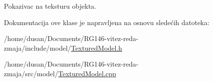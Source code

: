 Pokazivac na teksturu objekta. 



Dokumentacija ove klase je napravljena na osnovu sledećih datoteka\+:\begin{DoxyCompactItemize}
\item 
/home/dusan/\+Documents/\+R\+G146-\/vitez-\/reda-\/zmaja/include/model/\hyperlink{TexturedModel_8h}{Textured\+Model.\+h}\item 
/home/dusan/\+Documents/\+R\+G146-\/vitez-\/reda-\/zmaja/src/model/\hyperlink{TexturedModel_8cpp}{Textured\+Model.\+cpp}\end{DoxyCompactItemize}
